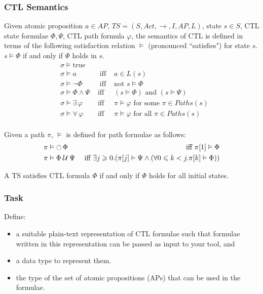 \documentclass{article}
\begin{document}
\subsubsection*{CTL Semantics}
Given atomic proposition $a \in AP$, $TS = (S, Act, \rightarrow, I, AP, L)$, state $s \in S$, 
CTL state formulae $\Phi, \Psi$, CTL path formula $\varphi$, 
the semantics of CTL is defined in terms of the following satisfaction relation $\vDash$ (pronounced ``satisfies") for state $s$. 
$s \vDash \Phi$ if and only if $\Phi$ holds in $s$.
\begin{align*}
     & \sigma \vDash \text{true} & \\
     & \sigma \vDash a &\; \text{ iff } & a \in L(s) \\ 
     & \sigma \vDash \neg \Phi &\; \text{ iff } & \text{not } s \vDash \Phi \\
     & \sigma \vDash \Phi \land \Psi & \text{ iff }&  (s \vDash \Phi) \text{ and } (s \vDash \Psi) \\
     & \sigma \vDash \exists \, \varphi & \text{ iff } & \pi \vDash \varphi \text{ for some } \pi \in Paths(s) \\ 
     & \sigma \vDash \forall \, \varphi & \text{ iff } & \pi \vDash \varphi \text{ for all } \pi \in Paths(s) \\ 
\end{align*}

Given a path $\pi$, $\vDash$ is defined for path formulae as follows: 
\begin{align*}
    & \pi \vDash \mathop{\ocircle}{\Phi} & \text{ iff } \pi[1]  \vDash \Phi \\ 
    & \pi \vDash \Phi \mathbin{\mathcal{U}} \Psi & \text{ iff } \exists j \geqslant 0. (\pi[j]  \vDash \Psi \land (\forall 0 \leqslant k < j. \pi[k]  \vDash \Phi))
\end{align*}

A TS satisfies CTL formula $\Phi$ if and only if $\Phi$ holds for all initial states.

\color{red}
\subsubsection*{Task}
Define:
\begin{itemize}
    \item a suitable plain-text representation of CTL formulae such that formulae written in this representation can be passed as input to your tool, and 
    \item a data type to represent them.
    \item the type of the set of atomic propositions (APs) that can be used in the formulae.
\end{itemize}
\color{black}
\end{document}
